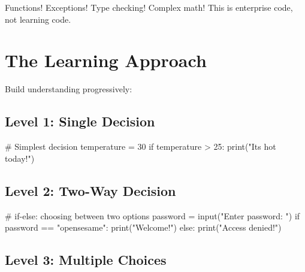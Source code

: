 \documentclass[
  letterpaper,
  DIV=11,
  numbers=noendperiod,
  oneside]{scrreprt}
\newenvironment{Shaded}{}{}
\newcommand{\BuiltInTok}[1]{\textcolor[rgb]{0.84,0.23,0.29}{#1}}
\newcommand{\CommentTok}[1]{\textcolor[rgb]{0.42,0.45,0.49}{#1}}
\newcommand{\ControlFlowTok}[1]{\textcolor[rgb]{0.84,0.23,0.29}{#1}}
\newcommand{\DecValTok}[1]{\textcolor[rgb]{0.00,0.36,0.77}{#1}}
\newcommand{\NormalTok}[1]{\textcolor[rgb]{0.14,0.16,0.18}{#1}}
\newcommand{\OperatorTok}[1]{\textcolor[rgb]{0.14,0.16,0.18}{#1}}
\newcommand{\StringTok}[1]{\textcolor[rgb]{0.01,0.18,0.38}{#1}}
\begin{document}
Functions! Exceptions! Type checking! Complex math! This is enterprise
code, not learning code.

\section{The Learning Approach}\label{the-learning-approach-3}

Build understanding progressively:

\subsection{Level 1: Single Decision}\label{level-1-single-decision}

\begin{Shaded}
\begin{Highlighting}[]
\CommentTok{\# Simplest decision}
\NormalTok{temperature }\OperatorTok{=} \DecValTok{30}
\ControlFlowTok{if}\NormalTok{ temperature }\OperatorTok{\textgreater{}} \DecValTok{25}\NormalTok{:}
    \BuiltInTok{print}\NormalTok{(}\StringTok{"It\textquotesingle{}s hot today!"}\NormalTok{)}
\end{Highlighting}
\end{Shaded}

\subsection{Level 2: Two-Way Decision}\label{level-2-two-way-decision}

\begin{Shaded}
\begin{Highlighting}[]
\CommentTok{\# if{-}else: choosing between two options}
\NormalTok{password }\OperatorTok{=} \BuiltInTok{input}\NormalTok{(}\StringTok{"Enter password: "}\NormalTok{)}
\ControlFlowTok{if}\NormalTok{ password }\OperatorTok{==} \StringTok{"opensesame"}\NormalTok{:}
    \BuiltInTok{print}\NormalTok{(}\StringTok{"Welcome!"}\NormalTok{)}
\ControlFlowTok{else}\NormalTok{:}
    \BuiltInTok{print}\NormalTok{(}\StringTok{"Access denied!"}\NormalTok{)}
\end{Highlighting}
\end{Shaded}

\subsection{Level 3: Multiple Choices}\label{level-3-multiple-choices}
\end{document}
